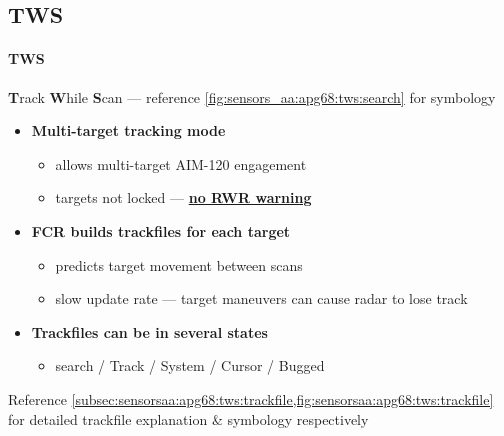 \subsection{TWS}
\label{subsec:tws}

\paragraph{TWS}
\textbf{T}rack \textbf{W}hile \textbf{S}can --- reference \cref{fig:sensors_aa:apg68:tws:search} for symbology

\begin{itemize}
    \item \textbf{Multi-target tracking mode}
    \begin{itemize}
        \item allows multi-target AIM-120 engagement
        \item targets not locked --- \textbf{\underline{no RWR warning}}
    \end{itemize}
    \item \textbf{FCR builds trackfiles for each target}
    \begin{itemize}
        \item predicts target movement between scans
        \item slow update rate --- target maneuvers can cause radar to lose track
    \end{itemize}
    \item \textbf{Trackfiles can be in several states}
    \begin{itemize}
        \item search / Track / System / Cursor / Bugged
    \end{itemize}
\end{itemize}

Reference \cref{subsec:sensorsaa:apg68:tws:trackfile,fig:sensorsaa:apg68:tws:trackfile} 
for detailed trackfile explanation \& symbology respectively

